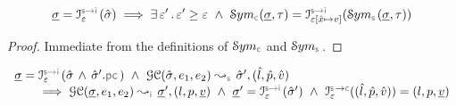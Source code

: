 \begin{lemma}\label{lemma:symbvalue:soundiness}
$$
\istate = \interpret{\symbinst}{\senv}(\sstate) 
   \implies \exists \, \senv' \, . \,  \senv' \fextends \senv \ \wedge \ \absmakesymbolicrule{\concrete}{\istate, \jtype} 
              = \interpret{\symbinst}{\senv[\svar \mapsto \val]}(\absmakesymbolicrule{\symbolic}{\istate, \jtype})
$$
 \end{lemma}
 \begin{proof}
 Immediate from the definitions of $\absmakesymbolic_{\concrete}$ and $\absmakesymbolic_{\symbolic}$.  
 \end{proof}


\begin{lemma}\label{soundiness:getcell}
$$
\begin{array}{l}
\istate = \interpret{\symbinst}{\senv}(\sstate \, \wedge \, \sstate'.\pcsel)  \ \wedge \ 
\absgetcellrule{\symbolic}{\sstate, \jsilexpr_1, \jsilexpr_2}{\sstate', (\sloc, \sexprp, \sexprv)} \\ \quad \quad
  \implies \absgetcellrule{\instrumented}{\istate, \jsilexpr_1, \jsilexpr_2}{\istate', (\loc, p, \ival)} 
     \ \wedge \ \istate' = \interpret{\symbinst}{\senv}(\sstate')
     \ \wedge \ \interpret{\symbconc}{\senv}((\sloc, \sexprp, \sexprv)) = (\loc, p, \ival)
\end{array}
$$
 \end{lemma}
